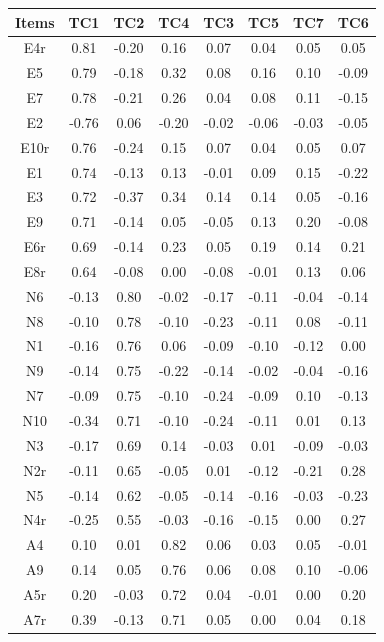 \documentclass[
  english,
  man, fleqn, noextraspace]{apa6}
\begin{document}
\begin{table}[tbp]
\begin{center}
\begin{threeparttable}
{\begin{tabular}{cccccccc}
\toprule
Items & \multicolumn{1}{c}{TC1} & \multicolumn{1}{c}{TC2} & \multicolumn{1}{c}{TC4} & \multicolumn{1}{c}{TC3} & \multicolumn{1}{c}{TC5} & \multicolumn{1}{c}{TC7} & \multicolumn{1}{c}{TC6}\\
\midrule
E4r & 0.81 & -0.20 & 0.16 & 0.07 & 0.04 & 0.05 & 0.05\\
E5 & 0.79 & -0.18 & 0.32 & 0.08 & 0.16 & 0.10 & -0.09\\
E7 & 0.78 & -0.21 & 0.26 & 0.04 & 0.08 & 0.11 & -0.15\\
E2 & -0.76 & 0.06 & -0.20 & -0.02 & -0.06 & -0.03 & -0.05\\
E10r & 0.76 & -0.24 & 0.15 & 0.07 & 0.04 & 0.05 & 0.07\\
E1 & 0.74 & -0.13 & 0.13 & -0.01 & 0.09 & 0.15 & -0.22\\
E3 & 0.72 & -0.37 & 0.34 & 0.14 & 0.14 & 0.05 & -0.16\\
E9 & 0.71 & -0.14 & 0.05 & -0.05 & 0.13 & 0.20 & -0.08\\
E6r & 0.69 & -0.14 & 0.23 & 0.05 & 0.19 & 0.14 & 0.21\\
E8r & 0.64 & -0.08 & 0.00 & -0.08 & -0.01 & 0.13 & 0.06\\
N6 & -0.13 & 0.80 & -0.02 & -0.17 & -0.11 & -0.04 & -0.14\\
N8 & -0.10 & 0.78 & -0.10 & -0.23 & -0.11 & 0.08 & -0.11\\
N1 & -0.16 & 0.76 & 0.06 & -0.09 & -0.10 & -0.12 & 0.00\\
N9 & -0.14 & 0.75 & -0.22 & -0.14 & -0.02 & -0.04 & -0.16\\
N7 & -0.09 & 0.75 & -0.10 & -0.24 & -0.09 & 0.10 & -0.13\\
N10 & -0.34 & 0.71 & -0.10 & -0.24 & -0.11 & 0.01 & 0.13\\
N3 & -0.17 & 0.69 & 0.14 & -0.03 & 0.01 & -0.09 & -0.03\\
N2r & -0.11 & 0.65 & -0.05 & 0.01 & -0.12 & -0.21 & 0.28\\
N5 & -0.14 & 0.62 & -0.05 & -0.14 & -0.16 & -0.03 & -0.23\\
N4r & -0.25 & 0.55 & -0.03 & -0.16 & -0.15 & 0.00 & 0.27\\
A4 & 0.10 & 0.01 & 0.82 & 0.06 & 0.03 & 0.05 & -0.01\\
A9 & 0.14 & 0.05 & 0.76 & 0.06 & 0.08 & 0.10 & -0.06\\
A5r & 0.20 & -0.03 & 0.72 & 0.04 & -0.01 & 0.00 & 0.20\\
A7r & 0.39 & -0.13 & 0.71 & 0.05 & 0.00 & 0.04 & 0.18\\

\end{tabular}}
\end{threeparttable}
\end{center}
\end{table}
\end{document}
